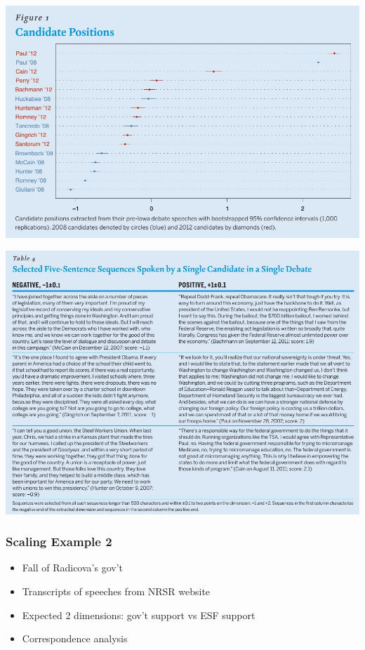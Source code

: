 \documentclass[20pt]{beamer}
\begin{document}
\begin{frame}
	\hspace*{-12mm}
    \href{http://journals.cambridge.org/action/displayAbstract?fromPage=online&aid=9365711&fileId=S1049096514001085}{\includegraphics[width=1.01\paperwidth]{fig1_blog.jpg}}
\end{frame}


\begin{frame}
	\vspace*{-1mm}
	\hspace*{-12mm}
    \href{http://journals.cambridge.org/action/displayAbstract?fromPage=online&aid=9365711&fileId=S1049096514001085}{\includegraphics[width=1.01\paperwidth]{tab4_blog.jpg}}
\end{frame}


\begin{frame}
	\frametitle{Scaling Example 2}
	\begin{itemize}
		\item 	Fall of Radicova's gov't
		\item 	Transcripts of speeches from NRSR website
		\item 	Expected 2 dimensions: gov't support vs ESF support
		\item   Correspondence analysis
	\end{itemize}
\end{frame}
\end{document}
